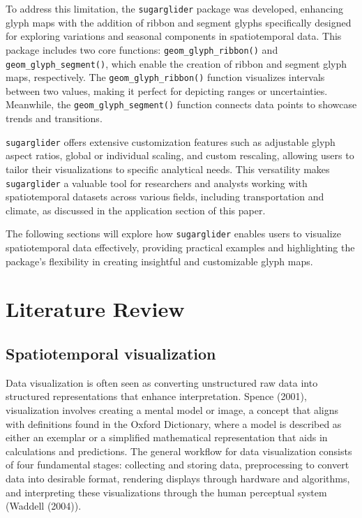 To address this limitation, the \texttt{sugarglider} package was developed, enhancing glyph maps with the addition of ribbon and segment glyphs specifically designed for exploring variations and seasonal components in spatiotemporal data. This package includes two core functions: \texttt{geom\_glyph\_ribbon()} and \texttt{geom\_glyph\_segment()}, which enable the creation of ribbon and segment glyph maps, respectively. The \texttt{geom\_glyph\_ribbon()} function visualizes intervals between two values, making it perfect for depicting ranges or uncertainties. Meanwhile, the \texttt{geom\_glyph\_segment()} function connects data points to showcase trends and transitions.

\texttt{sugarglider} offers extensive customization features such as adjustable glyph aspect ratios, global or individual scaling, and custom rescaling, allowing users to tailor their visualizations to specific analytical needs. This versatility makes \texttt{sugarglider} a valuable tool for researchers and analysts working with spatiotemporal datasets across various fields, including transportation and climate, as discussed in the application section of this paper.

The following sections will explore how \texttt{sugarglider} enables users to visualize spatiotemporal data effectively, providing practical examples and highlighting the package's flexibility in creating insightful and customizable glyph maps.

\hypertarget{literature-review}{%
\section{Literature Review}\label{literature-review}}

\hypertarget{spatiotemporal-visualization}{%
\subsection{Spatiotemporal visualization}\label{spatiotemporal-visualization}}

Data visualization is often seen as converting unstructured raw data into structured representations that enhance interpretation. Spence (2001), visualization involves creating a mental model or image, a concept that aligns with definitions found in the Oxford Dictionary, where a model is described as either an exemplar or a simplified mathematical representation that aids in calculations and predictions. The general workflow for data visualization consists of four fundamental stages: collecting and storing data, preprocessing to convert data into desirable format, rendering displays through hardware and algorithms, and interpreting these visualizations through the human perceptual system (Waddell (2004)).

